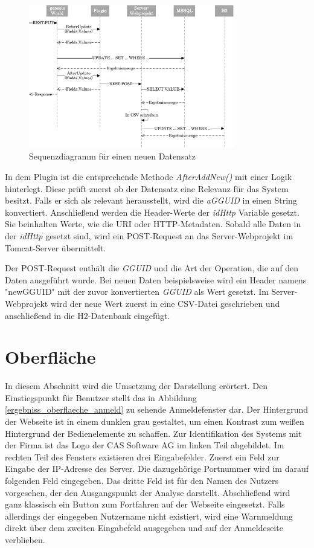 \begin{figure}[htbp]
\centering
  \includegraphics[width=0.8\textwidth]{pics/sequenzdiagramm.pdf}
\caption{Sequenzdiagramm für einen neuen Datensatz}
\label{umsetzung_sequenz}
\end{figure}

In dem Plugin ist die entsprechende Methode \textit{AfterAddNew()} mit einer Logik hinterlegt. Diese prüft zuerst ob der Datensatz eine Relevanz für das System besitzt. Falls er sich als relevant herausstellt, wird die \textit{aGGUID} in einen String konvertiert. Anschließend werden die Header-Werte der \textit{idHttp} Variable gesetzt. Sie beinhalten Werte, wie die URI oder HTTP-Metadaten. Sobald alle Daten in der \textit{idHttp} gesetzt sind, wird ein POST-Request an das Server-Webprojekt im Tomcat-Server übermittelt. 

Der POST-Request enthält die \textit{GGUID} und die Art der Operation, die auf den Daten ausgeführt wurde. Bei neuen Daten beispielsweise wird ein Header namens "newGGUID" mit der zuvor konvertierten \textit{GGUID} als Wert gesetzt. Im Server-Webprojekt wird der neue Wert zuerst in eine CSV-Datei geschrieben und anschließend in die H2-Datenbank eingefügt.


\section{Oberfläche}

In diesem Abschnitt wird die Umsetzung der Darstellung erörtert. Den Einstiegspunkt für Benutzer stellt das in Abbildung \ref{ergebniss_oberflaeche_anmeld} zu sehende Anmeldefenster dar. Der Hintergrund der Webseite ist in einem dunklen grau gestaltet, um einen Kontrast zum weißen Hintergrund der Bedienelemente zu schaffen. Zur Identifikation des Systems mit der Firma ist das Logo der CAS Software AG im linken Teil abgebildet. Im rechten Teil des Fensters existieren drei Eingabefelder. Zuerst ein Feld zur Eingabe der IP-Adresse des Server. Die dazugehörige Portnummer wird im darauf folgenden Feld eingegeben. Das dritte Feld ist für den Namen des Nutzers vorgesehen, der den Ausgangspunkt der Analyse darstellt. Abschließend wird ganz klassisch ein Button zum Fortfahren auf der Webseite eingesetzt. Falls allerdings der eingegeben Nutzername nicht existiert, wird eine Warnmeldung direkt über dem zweiten Eingabefeld ausgegeben und auf der Anmeldeseite verblieben. 

